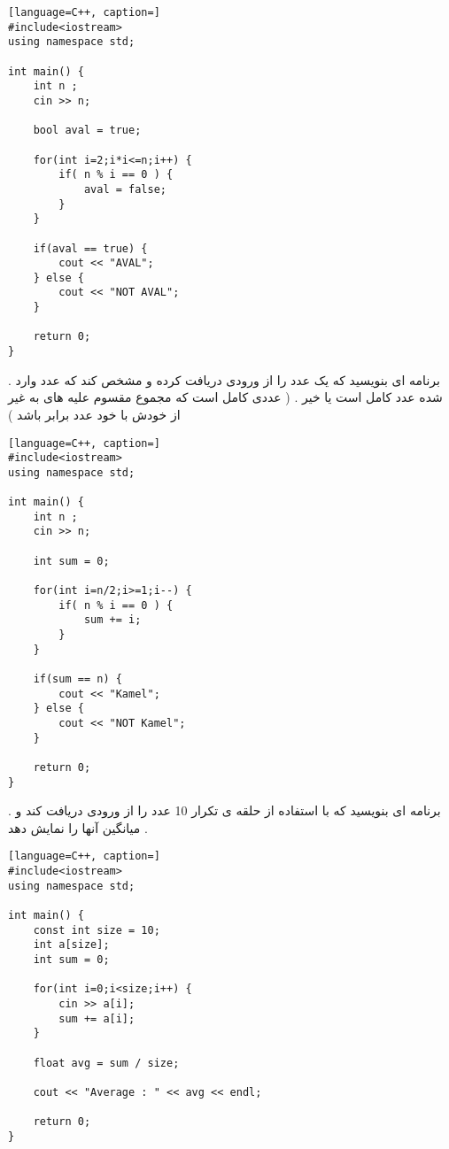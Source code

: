 \documentclass[12pt]{article}
\begin{document}
\begin{latin}
\begin{lstlisting}[language=C++, caption=]
#include<iostream>
using namespace std;

int main() {
	int n ;
	cin >> n;
	
	bool aval = true;
	
	for(int i=2;i*i<=n;i++) {
		if( n % i == 0 ) {
			aval = false;
		}
	}

	if(aval == true) {
		cout << "AVAL";
	} else {
		cout << "NOT AVAL";
	}
	
	return 0;
}
\end{lstlisting}
\end{latin}










\newpage

 . برنامه ای بنویسید که یک عدد را از ورودی دریافت کرده و مشخص کند که عدد وارد شده عدد کامل است یا خیر . ( عددی کامل است که مجموع مقسوم علیه های به غیر از خودش با خود عدد برابر باشد )





\begin{latin}
\begin{lstlisting}[language=C++, caption=]
#include<iostream>
using namespace std;

int main() {
	int n ;
	cin >> n;
	
	int sum = 0;
	
	for(int i=n/2;i>=1;i--) {
		if( n % i == 0 ) {
			sum += i;
		}
	}

	if(sum == n) {
		cout << "Kamel";
	} else {
		cout << "NOT Kamel";
	}
	
	return 0;
}
\end{lstlisting}
\end{latin}







\newpage

 . برنامه ای بنویسید که با استفاده از حلقه ی تکرار 10 عدد را از ورودی دریافت کند و میانگین آنها را نمایش دهد .






\begin{latin}
\begin{lstlisting}[language=C++, caption=]
#include<iostream>
using namespace std;

int main() {
	const int size = 10;
	int a[size];
	int sum = 0;
	
	for(int i=0;i<size;i++) {
		cin >> a[i];
		sum += a[i];
	}
	
	float avg = sum / size;

	cout << "Average : " << avg << endl;
	
	return 0;
}
\end{lstlisting}
\end{latin}
\end{document}
